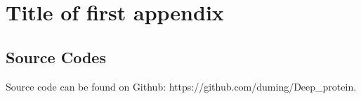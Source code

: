 \newpage
{}
\appendix

\chapter{Title of first appendix}
	\label{AP_01}

\section{Source Codes}
Source code can be found on Github: https://github.com/duming/Deep\_protein.
